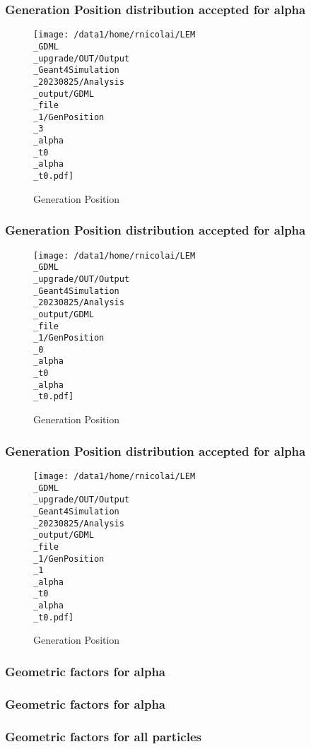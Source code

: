\documentclass[8pt]{beamer}
\begin{document}
            \begin{frame}
                \frametitle{Generation Position distribution accepted for alpha}
            
        \begin{figure}[h]
            \centering
            \texttt{[image: /data1/home/rnicolai/LEM\\\_GDML\\\_upgrade/OUT/Output\\\_Geant4Simulation\\\_20230825/Analysis\\\_output/GDML\\\_file\\\_1/GenPosition\\\_3\\\_alpha\\\_t0\\\_alpha\\\_t0.pdf]}
            \caption{Generation Position}
        \end{figure}
        
            \end{frame}
            
            \begin{frame}
                \frametitle{Generation Position distribution accepted for alpha}
            
        \begin{figure}[h]
            \centering
            \texttt{[image: /data1/home/rnicolai/LEM\\\_GDML\\\_upgrade/OUT/Output\\\_Geant4Simulation\\\_20230825/Analysis\\\_output/GDML\\\_file\\\_1/GenPosition\\\_0\\\_alpha\\\_t0\\\_alpha\\\_t0.pdf]}
            \caption{Generation Position}
        \end{figure}
        
            \end{frame}
            
            \begin{frame}
                \frametitle{Generation Position distribution accepted for alpha}
            
        \begin{figure}[h]
            \centering
            \texttt{[image: /data1/home/rnicolai/LEM\\\_GDML\\\_upgrade/OUT/Output\\\_Geant4Simulation\\\_20230825/Analysis\\\_output/GDML\\\_file\\\_1/GenPosition\\\_1\\\_alpha\\\_t0\\\_alpha\\\_t0.pdf]}
            \caption{Generation Position}
        \end{figure}
        
            \end{frame}
            
            \begin{frame}
                \frametitle{Geometric factors for alpha}
            
            \end{frame}
            
            \begin{frame}
                \frametitle{Geometric factors for alpha}
            
            \end{frame}
            
            \begin{frame}
                \frametitle{Geometric factors for all particles}
            
            \end{frame}
            
        
\end{document}
